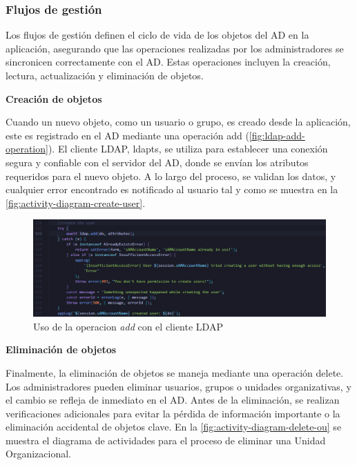 \subsubsection{Flujos de gestión}

Los flujos de gestión definen el ciclo de vida de los objetos del AD en la aplicación, asegurando que las operaciones realizadas por los administradores se sincronicen correctamente con el AD. Estas operaciones incluyen la creación, lectura, actualización y eliminación de objetos.

\textbf{Creación de objetos}

Cuando un nuevo objeto, como un usuario o grupo, es creado desde la aplicación, este es registrado en el AD mediante una operación add (\autoref{fig:ldap-add-operation}). El cliente LDAP, ldapts, se utiliza para establecer una conexión segura y confiable con el servidor del AD, donde se envían los atributos requeridos para el nuevo objeto. A lo largo del proceso, se validan los datos, y cualquier error encontrado es notificado al usuario tal y como se muestra en la \autoref{fig:activity-diagram-create-user}.

\begin{figure}[H]
    \centering
    \includegraphics[width=\linewidth]{images/code/ldap-add-operation.png}
    \caption{Uso de la operacion \textit{add} con el cliente LDAP}
    \label{fig:ldap-add-operation}
\end{figure}


\textbf{Eliminación de objetos}

Finalmente, la eliminación de objetos se maneja mediante una operación delete. Los administradores pueden eliminar usuarios, grupos o unidades organizativas, y el cambio se refleja de inmediato en el AD. Antes de la eliminación, se realizan verificaciones adicionales para evitar la pérdida de información importante o la eliminación accidental de objetos clave. En la \autoref{fig:activity-diagram-delete-ou} se muestra el diagrama de actividades para el proceso de eliminar una Unidad Organizacional.

